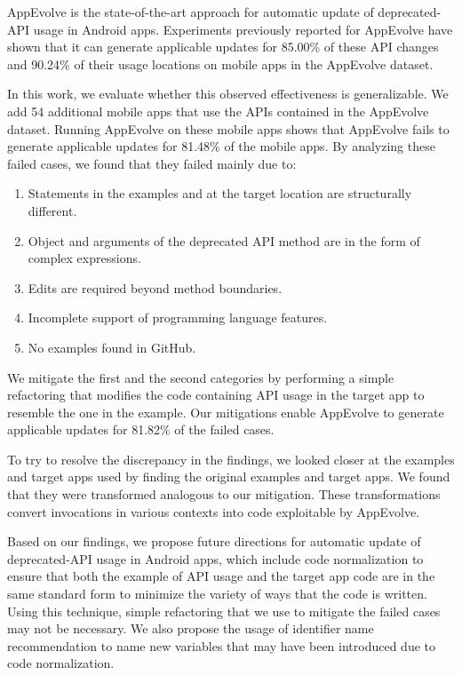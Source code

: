 AppEvolve is the state-of-the-art approach for automatic update of
deprecated-API usage in Android apps. Experiments previously reported for
AppEvolve have shown that it can generate applicable updates for
85.00\% of these API
changes and 90.24\% of their usage locations on mobile apps in the
AppEvolve dataset.

In this work, we evaluate whether this observed effectiveness is
generalizable. We add 54 additional mobile apps that use the APIs contained
in the AppEvolve dataset. Running AppEvolve on these mobile apps shows that
AppEvolve fails to generate applicable updates for 81.48\% of the mobile
apps. By analyzing these failed cases, we found that they failed mainly
due to:
\begin{enumerate}
    \item Statements in the examples and at the target location are structurally different.
    \item Object and arguments of the deprecated API method are in the form of complex expressions.
    \item Edits are required beyond method boundaries.
    \item Incomplete support of programming language features.
    \item No examples found in GitHub.
\end{enumerate}
We mitigate the first and the second categories by performing a simple
refactoring that modifies the code containing API usage in the target app
to resemble the one in the example. Our mitigations enable AppEvolve
to generate applicable updates for 81.82\% of the failed cases.

To try to resolve the discrepancy in the findings, we looked closer at the
examples and target apps used by finding the original examples and target
apps. We found that they were transformed analogous to our mitigation.
These transformations convert invocations in various contexts into code
exploitable by AppEvolve.

Based on our findings, we propose future directions for automatic update of
deprecated-API usage in Android apps, which include code normalization to
ensure that both the example of API usage and the target app code are in
the same standard form to minimize the variety of ways that the code is
written. Using this technique, simple refactoring that we use to mitigate
the failed cases may not be necessary. We also propose the usage of
identifier name recommendation to name new variables that may have been
introduced due to code normalization.
